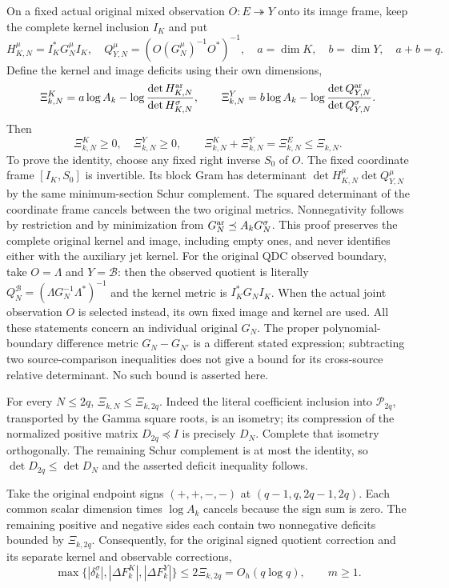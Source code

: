 \documentclass[11pt,a4paper]{article}
\begin{document}
On a fixed actual original mixed observation $O:E\twoheadrightarrow Y$
onto its image frame, keep the complete kernel inclusion $I_K$ and put
\[
 H_{K,N}^\mu=I_K^*G_N^\mu I_K,\quad
 Q_{Y,N}^\mu=(O(G_N^\mu)^{-1}O^*)^{-1},\quad a=\dim K,\quad b=\dim Y,
 \quad a+b=q.
\]
Define the kernel and image deficits using their own dimensions,
\[
 \Xi^K_{k,N}=a\log A_k-\log\frac{\det H_{K,N}^{\rm ar}}
                                      {\det H_{K,N}^\sigma},\qquad
 \Xi^Y_{k,N}=b\log A_k-\log\frac{\det Q_{Y,N}^{\rm ar}}
                                      {\det Q_{Y,N}^\sigma}.
\]
Then
\begin{equation}\tag{GTM19}
 \Xi^K_{k,N}\ge0,\quad\Xi^Y_{k,N}\ge0,\qquad
 \Xi^K_{k,N}+\Xi^Y_{k,N}=\Xi^E_{k,N}\le\Xi_{k,N}.
\end{equation}
To prove the identity, choose any fixed right inverse $S_0$ of $O$.
The fixed coordinate frame $[I_K,S_0]$ is invertible.  Its block Gram
has determinant $\det H_{K,N}^\mu\det Q_{Y,N}^\mu$ by the
same minimum-section Schur complement.  The squared determinant of
the coordinate frame cancels between the two original metrics.
Nonnegativity follows by restriction and by minimization from
$G_N^{\rm ar}\preceq A_kG_N^\sigma$.
This proof preserves the complete original kernel and image, including
empty ones, and never identifies either with the auxiliary jet kernel.
For the original QDC observed boundary, take $O=\Lambda$ and
$Y=\mathcal B$: then the observed quotient is literally
$Q_N^{\mathcal B}=(\Lambda G_N^{-1}\Lambda^*)^{-1}$ and the
kernel metric is $I_K^*G_NI_K$.  When the actual joint observation
$O$ is selected instead, its own fixed image and kernel are used.
All these statements concern an individual original $G_N$.
The proper polynomial-boundary difference metric
$G_N-G_{N'}$ is a different stated expression; subtracting two
source-comparison inequalities does not give a bound for its
cross-source relative determinant.  No such bound is asserted here.

For every $N\le2q$, $\Xi_{k,N}\le\Xi_{k,2q}$.
Indeed the literal coefficient inclusion into $\mathcal P_{2q}$,
transported by the Gamma square roots, is an isometry; its compression
of the normalized positive matrix $D_{2q}\preceq I$ is precisely
$D_N$.  Complete that isometry orthogonally.  The remaining Schur
complement is at most the identity, so
$\det D_{2q}\le\det D_N$ and the asserted deficit inequality follows.

Take the original endpoint signs $(+,+,-,-)$ at
$(q-1,q,2q-1,2q)$.  Each common scalar dimension times
$\log A_k$ cancels because the sign sum is zero.  The remaining
positive and negative sides each contain two nonnegative deficits
bounded by $\Xi_{k,2q}$.  Consequently, for the original signed
quotient correction and its separate kernel and observable corrections,
\begin{equation}\tag{GTM20}
 \boxed{\max\{|\delta_k^\sigma|,|\Delta F_k^K|,|\Delta F_k^Y|\}
 \le2\Xi_{k,2q}=O_h(q\log q),\qquad m\ge1.}
\end{equation}
\end{document}
